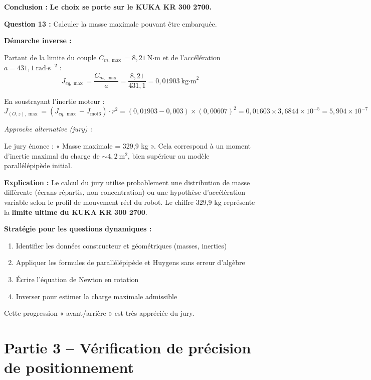 \documentclass[12pt,a4paper,twoside]{article}
\begin{document}
\begin{correction}
  \textbf{Conclusion :} \textbf{Le choix se porte sur le KUKA KR 300 2700.}

  \textbf{Question 13 :} Calculer la masse maximale pouvant être embarquée.

  \textbf{Démarche inverse :}

  Partant de la limite du couple $C_{m,\max} = 8,21~\text{N·m}$ et de l'accélération $a = 431,1~\text{rad·s}^{-2}$ :
  \[
    J_{eq,\max} = \frac{C_{m,\max}}{a} = \frac{8,21}{431,1} = 0,01903~\text{kg·m}^2
  \]

  En soustrayant l'inertie moteur :
  \[
    J_{(O,z),\max} = (J_{eq,\max} - J_{\text{mot6}}) \cdot r^2 = (0,01903 - 0,003) \times (0,00607)^2 = 0,01603 \times 3,6844 \times 10^{-5} = 5,904 \times 10^{-7}
  \]

  \textit{Approche alternative (jury) :}

  Le jury énonce : « Masse maximale = 329,9 kg ». Cela correspond à un moment d'inertie maximal du charge de \( \sim 4,2~\text{m}^2 \), bien supérieur au modèle parallélépipède initial.

  \textbf{Explication :} Le calcul du jury utilise probablement une distribution de masse différente (écrans répartis, non concentration) ou une hypothèse d'accélération variable selon le profil de mouvement réel du robot. Le chiffre 329,9 kg représente la \textbf{limite ultime du KUKA KR 300 2700}.
\end{correction}

\begin{methode}
  \textbf{Stratégie pour les questions dynamiques :}
  \begin{enumerate}
    \item Identifier les données constructeur et géométriques (masses, inerties)
    \item Appliquer les formules de parallélépipède et Huygens sans erreur d'algèbre
    \item Écrire l'équation de Newton en rotation
    \item Inverser pour estimer la charge maximale admissible
  \end{enumerate}

  Cette progression « avant/arrière » est très appréciée du jury.
\end{methode}

\newpage

\section{Partie 3 -- Vérification de précision de positionnement}
\end{document}
